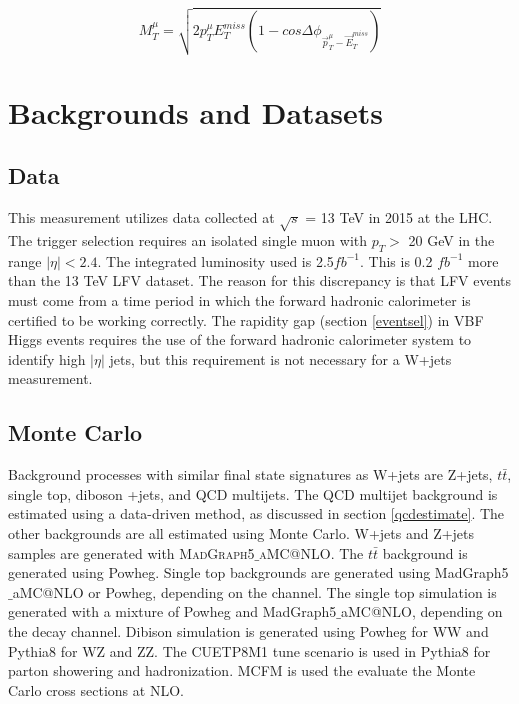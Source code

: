 \documentclass[oneside, letterpaper, oldfontcommands]{memoir}
\begin{document}
\begin{equation}
M_{T}^{\mu} = \sqrt{2 p_{T}^{\mu}E_{T}^{miss}(1-cos \Delta\phi_{\vec{p}_{T}^{\mu}-\vec{E}_{T}^{miss}})}
\label{eq:mtmu}
\end{equation}

\section{Backgrounds and Datasets}
\subsection{Data}
\qquad This measurement utilizes data collected at $\sqrt{s}$ = 13 TeV in 2015 at the LHC. The trigger selection requires an isolated single muon with $p_{T} >$ 20 GeV in the range $|\eta| < 2.4$. The integrated luminosity used is 2.5$fb^{-1}$. This is 0.2 $fb^{-1}$ more than the 13 TeV LFV dataset. The reason for this discrepancy is that LFV events must come from a time period in which the forward hadronic calorimeter is certified to be working correctly. The rapidity gap (section \ref{eventsel}) in VBF Higgs events requires the use of the forward hadronic calorimeter system to identify high $|\eta|$ jets, but this requirement is not necessary for a W+jets measurement.

\subsection{Monte Carlo}\label{wjetsmc}
\qquad Background processes with similar final state signatures as W+jets are Z+jets, $t\bar{t}$, single top, diboson +jets, and QCD multijets. The QCD multijet background is estimated using a data-driven method, as discussed in section \ref{qcdestimate}. The other backgrounds are all estimated using Monte Carlo. W+jets and Z+jets samples are generated with \textsc{{\sc MadGraph5$\_$aMC@NLO}}\cite{Alwall:2014hca}. 
The $t\bar{t}$ background is generated using {\sc Powheg}. Single top backgrounds are generated using {\sc MadGraph5$\_$aMC@NLO} or {\sc Powheg}\cite{Frixione:2007nu}, depending on the channel. 
The single top simulation is generated with a mixture of {\sc Powheg} and {\sc MadGraph5$\_$aMC@NLO}, depending on the decay channel. Dibison simulation is generated using {\sc Powheg} for WW and {\sc Pythia}8 for WZ and ZZ. The CUETP8M1\cite{Khachatryan:2015pea} tune scenario is used in {\sc Pythia}8 for parton showering and hadronization. MCFM \cite{Campbell:2015qma}\cite{Campbell:2011bn}\cite{Campbell:1999ah} is used the evaluate the Monte Carlo cross sections at NLO. 
\end{document}
